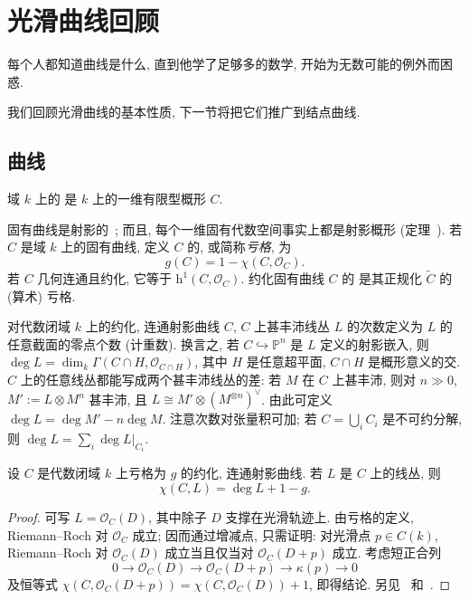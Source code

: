 \section{光滑曲线回顾}\label{src:6.1}
\begin{epigraph}
每个人都知道曲线是什么, 直到他学了足够多的数学, 开始为无数可能的例外而困惑.
\end{epigraph}
我们回顾光滑曲线的基本性质, 下一节将把它们推广到结点曲线.
\subsection{曲线}\label{src:6.1.1-subsection}
\begin{definition}\label{src:6.1.1}
域 $k$ 上的 是 $k$ 上的一维有限型概形 $C$.
\end{definition}
固有曲线是射影的~\cite[命题 I.6.7]{Har77}; 而且, 每个一维固有代数空间事实上都是射影概形 (定理~). 若 $C$ 是域 $k$ 上的固有曲线, 定义 $C$ 的, 或简称\textit{亏格}, 为
\[
g(C)=1-\chi(C,\mathcal O_C).
\]
若 $C$ 几何连通且约化, 它等于 $\mathrm h^1(C,\allowbreak \mathcal O_C)$. 约化固有曲线 $C$ 的 是其正规化 $\widetilde C$ 的 (算术) 亏格.

对代数闭域 $k$ 上的约化, 连通射影曲线 $C$, $C$ 上甚丰沛线丛 $L$ 的次数定义为 $L$ 的任意截面的零点个数 (计重数). 换言之, 若 $C\hookrightarrow\mathbb P^n$ 是 $L$ 定义的射影嵌入, 则 $\deg L=\dim_k\Gamma(C\cap H,\allowbreak \mathcal O_{C\cap H})$, 其中 $H$ 是任意超平面, $C\cap H$ 是概形意义的交. $C$ 上的任意线丛都能写成两个甚丰沛线丛的差: 若 $M$ 在 $C$ 上甚丰沛, 则对 $n\gg0$, $M':=L\otimes M^n$ 甚丰沛, 且 $L\cong M'\otimes(M^{\otimes n})^\vee$. 由此可定义 $\deg L=\deg M'-n\deg M$. 注意次数对张量积可加; 若 $C=\bigcup_i C_i$ 是不可约分解, 则 $\deg L=\sum_i\deg L|_{C_i}$.
\begin{theorem}\label{src:6.1.2}
设 $C$ 是代数闭域 $k$ 上亏格为 $g$ 的约化, 连通射影曲线. 若 $L$ 是 $C$ 上的线丛, 则
\[
\chi(C,L)=\deg L+1-g.
\]
\end{theorem}
\begin{proof}
可写 $L=\mathcal O_C(D)$, 其中除子 $D$ 支撑在光滑轨迹上. 由亏格的定义, Riemann--Roch 对 $\mathcal O_C$ 成立; 因而通过增减点, 只需证明: 对光滑点 $p\in C(k)$, Riemann--Roch 对 $\mathcal O_C(D)$ 成立当且仅当对 $\mathcal O_C(D+p)$ 成立. 考虑短正合列
\[
0\to\mathcal O_C(D)\to\mathcal O_C(D+p)\to\kappa(p)\to0
\]
及恒等式 $\chi(C,\allowbreak \mathcal O_C(D+p))=\chi(C,\allowbreak \mathcal O_C(D))+1$, 即得结论. 另见~\cite[定理 IV.1.3, 习题 IV.1.9]{Har77} 和~\cite[习题 18.4.B 和 S]{Vak17}.
\end{proof}
